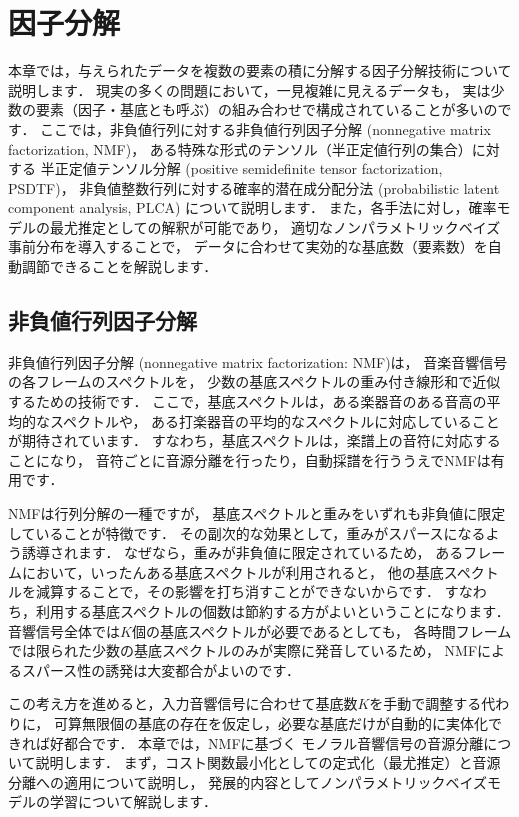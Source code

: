 ﻿\chapter{因子分解}

\begin{leadbox}
本章では，与えられたデータを複数の要素の積に分解する因子分解技術について説明します．
現実の多くの問題において，一見複雑に見えるデータも，
実は少数の要素（因子・基底とも呼ぶ）の組み合わせで構成されていることが多いのです．
ここでは，非負値行列に対する非負値行列因子分解 (nonnegative matrix factorization, NMF)，
ある特殊な形式のテンソル（半正定値行列の集合）に対する
半正定値テンソル分解 (positive semidefinite tensor factorization, PSDTF)，
非負値整数行列に対する確率的潜在成分配分法 (probabilistic latent component analysis, PLCA)
について説明します．
また，各手法に対し，確率モデルの最尤推定としての解釈が可能であり，
適切なノンパラメトリックベイズ事前分布を導入することで，
データに合わせて実効的な基底数（要素数）を自動調節できることを解説します．
\end{leadbox}

\section{非負値行列因子分解}
\label{sec:nmf}

非負値行列因子分解 (nonnegative matrix factorization: NMF)\cite{lee:nature:1999,fevotte:neco:2009}は，
音楽音響信号の各フレームのスペクトルを，
少数の基底スペクトルの重み付き線形和で近似するための技術です．
ここで，基底スペクトルは，ある楽器音のある音高の平均的なスペクトルや，
ある打楽器音の平均的なスペクトルに対応していることが期待されています．
すなわち，基底スペクトルは，楽譜上の音符に対応することになり，
音符ごとに音源分離を行ったり，自動採譜を行ううえでNMFは有用です．

NMFは行列分解の一種ですが，
基底スペクトルと重みをいずれも非負値に限定していることが特徴です．
その副次的な効果として，重みがスパースになるよう誘導されます．
なぜなら，重みが非負値に限定されているため，
あるフレームにおいて，いったんある基底スペクトルが利用されると，
他の基底スペクトルを減算することで，その影響を打ち消すことができないからです．
すなわち，利用する基底スペクトルの個数は節約する方がよいということになります．
音響信号全体では$K$個の基底スペクトルが必要であるとしても，
各時間フレームでは限られた少数の基底スペクトルのみが実際に発音しているため，
NMFによるスパース性の誘発は大変都合がよいのです．

この考え方を進めると，入力音響信号に合わせて基底数$K$を手動で調整する代わりに，
可算無限個の基底の存在を仮定し，必要な基底だけが自動的に実体化できれば好都合です．
本章では，NMFに基づく
モノラル音響信号の音源分離について説明します．
まず，コスト関数最小化としての定式化（最尤推定）と音源分離への適用について説明し，
発展的内容としてノンパラメトリックベイズモデルの学習について解説します．

